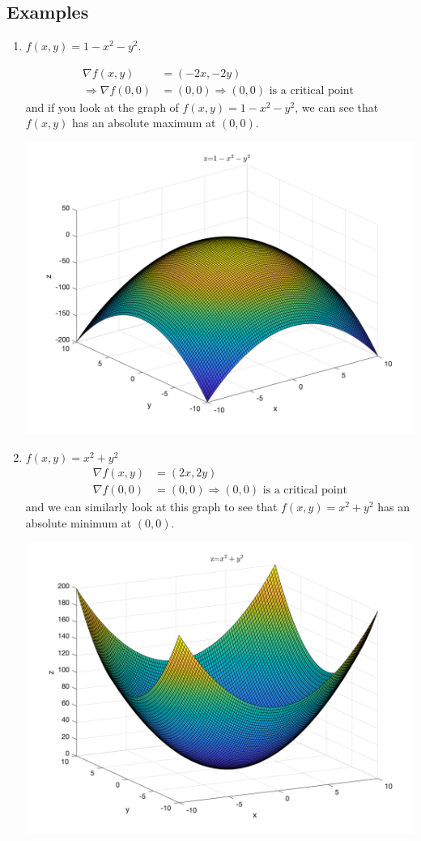 \documentclass[11pt]{article}
\begin{document}
\subsection{Examples}
\begin{enumerate}[ (i) ]
\item $f(x, y) = 1 - x^2 - y^2$.

\begin{align*}
\nabla f(x, y) &= (-2x, -2y) \\
\Rightarrow \nabla f(0, 0) &= (0, 0) \Rightarrow (0, 0) \text{ is a critical point }
\end{align*}
and if you look at the graph of $f(x, y) = 1 - x^2 - y^2$, we can see that $f(x, y)$ has an absolute maximum at $(0, 0)$.

\begin{center} \includegraphics[scale=0.25]{eg1} \end{center}

\item $f(x, y) = x^2 + y^2$
\begin{align*}
\nabla f(x, y) &= (2x, 2y) \\
\nabla f(0, 0) &= (0, 0) \Rightarrow (0, 0) \text{ is a critical point}
\end{align*}
and we can similarly look at this graph to see that $f(x, y) = x^2 + y^2$ has an absolute minimum at $(0, 0)$.

\begin{center} \includegraphics[scale=0.25]{eg2} \end{center}

\end{enumerate}
\end{document}
